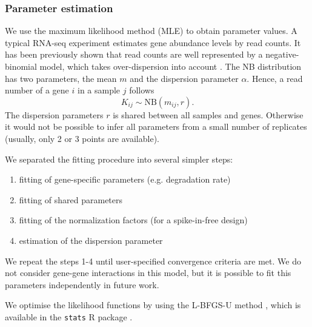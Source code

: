 \subsubsection*{Parameter estimation}
We use the maximum likelihood method (MLE) to obtain parameter values.
A typical RNA-seq experiment estimates gene abundance levels by read counts.
It has been previously shown that read counts are well represented by a negative-binomial model,
which takes over-dispersion into account 
\citep{robinson2007moderated}.
The NB distribution has two parameters, the mean $m$ and the dispersion parameter 
$\alpha$.
Hence,  a read number of a gene $i$ in a sample $j$ follows
\begin{equation}
 K_{ij} \sim \text{NB}(m_{ij}, r).
\end{equation}
The dispersion parameters $r$ is shared between all
samples and genes. Otherwise it would not be possible to infer all parameters 
from a small number of replicates (usually, only 2 or 3 points are available).

We separated the fitting procedure into several simpler steps:
\begin{enumerate}
 \item fitting of gene-specific parameters (e.g. degradation rate)
 \item fitting of shared parameters  
 \item fitting of the normalization factors (for a spike-in-free design)
 \item estimation of the dispersion parameter 
\end{enumerate}
We repeat the steps 1-4 until user-specified convergence criteria are met.
We do not consider gene-gene interactions in this model, but it is possible to 
 fit this parameters independently in future work. 

We optimise the likelihood functions by using the {L-BFGS-U} method \citep{byrd1995limited}, which is
available in the \verb|stats| R package \citep{rlang}.